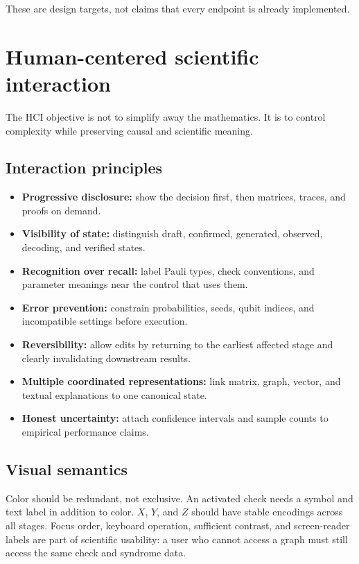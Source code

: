 \documentclass[11pt,letterpaper]{article}
\begin{document}
These are design targets, not claims that every endpoint is already implemented.

\section{Human-centered scientific interaction}

The HCI objective is not to simplify away the mathematics. It is to control complexity while
preserving causal and scientific meaning.

\subsection{Interaction principles}

\begin{itemize}
  \item \textbf{Progressive disclosure:} show the decision first, then matrices, traces, and proofs
  on demand.
  \item \textbf{Visibility of state:} distinguish draft, confirmed, generated, observed, decoding,
  and verified states.
  \item \textbf{Recognition over recall:} label Pauli types, check conventions, and parameter
  meanings near the control that uses them.
  \item \textbf{Error prevention:} constrain probabilities, seeds, qubit indices, and incompatible
  settings before execution.
  \item \textbf{Reversibility:} allow edits by returning to the earliest affected stage and clearly
  invalidating downstream results.
  \item \textbf{Multiple coordinated representations:} link matrix, graph, vector, and textual
  explanations to one canonical state.
  \item \textbf{Honest uncertainty:} attach confidence intervals and sample counts to empirical
  performance claims.
\end{itemize}

\subsection{Visual semantics}

Color should be redundant, not exclusive. An activated check needs a symbol and text label in
addition to color. $X$, $Y$, and $Z$ should have stable encodings across all stages. Focus order,
keyboard operation, sufficient contrast, and screen-reader labels are part of scientific usability:
a user who cannot access a graph must still access the same check and syndrome data.
\end{document}
